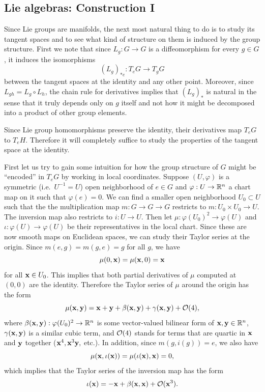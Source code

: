 \subsection{Lie algebras: Construction I}

Since Lie groups are manifolds, the next most natural thing to do is to study its tangent spaces and to see what kind of structure on them is induced by the group structure. 
First we note that since $L_g:G\to G$ is a diffeomorphism for every $g\in G$, it induces the isomorphisms
\[(L_g)_{\ast e}: T_e G\to T_g G\]
between the tangent spaces at the identity and any other point. Moreover, since $L_{gh}=L_g\circ L_h$, the chain rule for derivatives implies that $(L_g)_\ast$ is natural in the sense that it truly depends only on $g$ itself and not how it might be decomposed into a product of other group elements.

Since Lie group homomorphisms preserve the identity, their derivatives map $T_e G$ to $T_eH$. Therefore it will completely suffice to study the properties of the tangent space at the identity.


First let us try to gain some intuition for how the group structure of $G$ might be ``encoded'' in $T_e G$ by working in local coordinates. Suppose $(U,\varphi)$ is a symmetric (i.e.~$U^{-1}=U$) open neighborhood of $e\in G$ and $\varphi:U\to \bbR^n$ a chart map on it such that $\varphi(e)=0$. We can find a smaller open neighborhood $U_0\subset U$ such that the the multiplication map $m:G\to G\to G$ restricts to $m:U_0\times U_0\to U$. The inversion map also restricts to $i:U\to U$. Then let $\mu:\varphi (U_0)^2\to \varphi(U)$ and $\iota:\varphi(U)\to \varphi(U)$ be their representatives in the local chart. Since these are now smooth maps on Euclidean spaces, we can study their Taylor series at the origin. Since $m(e,g)=m(g,e)=g$ for all $g$, we have
\[\mu(0,\bf{x})=\mu(\bf{x},0)=\bf{x}\]
for all $\bf{x}\in U_0$. This implies that both partial derivatives of $\mu$ computed at $(0,0)$ are the identity. Therefore the Taylor series of $\mu$ around the origin has the form
\[\mu(\bf{x},\bf{y})=\bf{x}+\bf{y}+\beta(\bf{x},\bf{y})+\gamma(\bf{x},\bf{y})+\calO(4),\]
where $\beta(\bf{x},\bf{y}):\varphi(U_0)^2\to \bbR^n$ is some vector-valued bilinear form of $\bf{x},\bf{y}\in\bbR^n$, $\gamma(\bf{x},\bf{y})$ is a similar cubic term, and $\calO(4)$ stands for terms that are quartic in $\bf{x}$ and $\bf{y}$ together ($\bf{x}^4, \bf{x}^3 \bf{y},$ etc.). In addition, since $m(g,i(g))=e$, we also have
\[\mu(\bf{x},\iota(\bf{x}))=\mu(\iota(\bf{x}),\bf{x})=0,\]
which implies that the Taylor series of the inversion map has the form
\[\iota(\bf{x})=-\bf{x}+\beta(\bf{x},\bf{x})+\calO(\bf{x}^3).\]

